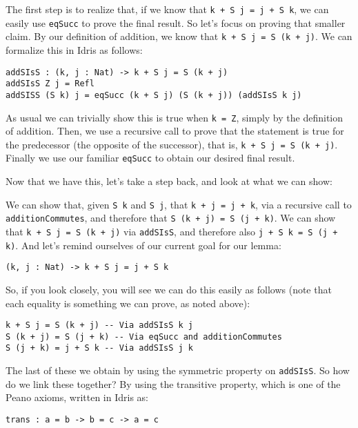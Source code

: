 \documentclass{article}
\newcommand{\inline}[1]{\texttt{#1}}
\begin{document}
The first step is to realize that, if we know that \inline{k + S j = j + S k}, we can easily use \inline{eqSucc} to prove the final result.
So let’s focus on proving that smaller claim.
By our definition of addition, we know that \inline{k + S j = S (k + j)}.
We can formalize this in Idris as follows:

\begin{verbatim}
addSIsS : (k, j : Nat) -> k + S j = S (k + j)
addSIsS Z j = Refl
addSISS (S k) j = eqSucc (k + S j) (S (k + j)) (addSIsS k j)
\end{verbatim}

As usual we can trivially show this is true when \inline{k = Z}, simply by the definition of addition.
Then, we use a recursive call to prove that the statement is true for the predecessor (the opposite of the successor), that is, \inline{k + S j = S (k + j)}.
Finally we use our familiar \inline{eqSucc} to obtain our desired final result.

Now that we have this, let’s take a step back, and look at what we can show:

We can show that, given \inline{S k} and \inline{S j}, that \inline{k + j = j + k}, via a recursive call to \inline{additionCommutes}, and therefore that \inline{S (k + j) = S (j + k)}.
We can show that \inline{k + S j = S (k + j)} via \inline{addSIsS}, and therefore also \inline{j + S k = S (j + k)}.
And let’s remind ourselves of our current goal for our lemma:

\begin{verbatim}
(k, j : Nat) -> k + S j = j + S k
\end{verbatim}

So, if you look closely, you will see we can do this easily as follows (note that each equality is something we can prove, as noted above):

\begin{verbatim}
k + S j = S (k + j) -- Via addSIsS k j
S (k + j) = S (j + k) -- Via eqSucc and additionCommutes
S (j + k) = j + S k -- Via addSIsS j k
\end{verbatim}

The last of these we obtain by using the symmetric property on \inline{addSIsS}.
So how do we link these together?
By using the transitive property, which is one of the Peano axioms, written in Idris as:

\begin{verbatim}
trans : a = b -> b = c -> a = c
\end{verbatim}
\end{document}
